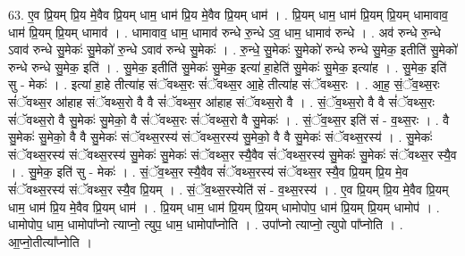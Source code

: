 \documentclass[17pt]{extarticle}
\begin{document}
63. ए॒व प्रि॒यम् प्रि॒य मे॒वैव प्रि॒यम् धाम॒ धाम॑ प्रि॒य मे॒वैव प्रि॒यम् धाम॑ । . प्रि॒यम् धाम॒ धाम॑ प्रि॒यम् प्रि॒यम् धामावाव॒ धाम॑ प्रि॒यम् प्रि॒यम् धामाव॑ । . धामावाव॒ धाम॒ धामाव॑ रुन्धे रु॒न्धे ऽव॒ धाम॒ धामाव॑ रुन्धे । . अव॑ रुन्धे रु॒न्धे ऽवाव॑ रुन्धे सु॒मेकः॑ सु॒मेको॑ रु॒न्धे ऽवाव॑ रुन्धे सु॒मेकः॑ । . रु॒न्धे॒ सु॒मेकः॑ सु॒मेको॑ रुन्धे रुन्धे सु॒मेक॒ इतीति॑ सु॒मेको॑ रुन्धे रुन्धे सु॒मेक॒ इति॑ । . सु॒मेक॒ इतीति॑ सु॒मेकः॑ सु॒मेक॒ इत्या॑ हा॒हेति॑ सु॒मेकः॑ सु॒मेक॒ इत्या॑ह । . सु॒मेक॒ इति॑ सु - मेकः॑ । . इत्या॑ हा॒हे तीत्या॑ह संॅवथ्स॒रः सं॑ॅवथ्स॒र आ॒हे तीत्या॑ह संॅवथ्स॒रः । . आ॒ह॒ सं॒ॅव॒थ्स॒रः सं॑ॅवथ्स॒र आ॑हाह संॅवथ्स॒रो वै वै सं॑ॅवथ्स॒र आ॑हाह संॅवथ्स॒रो वै । . सं॒ॅव॒थ्स॒रो वै वै सं॑ॅवथ्स॒रः सं॑ॅवथ्स॒रो वै सु॒मेकः॑ सु॒मेको॒ वै सं॑ॅवथ्स॒रः सं॑ॅवथ्स॒रो वै सु॒मेकः॑ । . सं॒ॅव॒थ्स॒र इति॑ सं - व॒थ्स॒रः । . वै सु॒मेकः॑ सु॒मेको॒ वै वै सु॒मेकः॑ संॅवथ्स॒रस्य॑ संॅवथ्स॒रस्य॑ सु॒मेको॒ वै वै सु॒मेकः॑ संॅवथ्स॒रस्य॑ । . सु॒मेकः॑ संॅवथ्स॒रस्य॑ संॅवथ्स॒रस्य॑ सु॒मेकः॑ सु॒मेकः॑ संॅवथ्स॒र स्यै॒वैव सं॑ॅवथ्स॒रस्य॑ सु॒मेकः॑ सु॒मेकः॑ संॅवथ्स॒र स्यै॒व । . सु॒मेक॒ इति॑ सु - मेकः॑ । . सं॒ॅव॒थ्स॒र स्यै॒वैव सं॑ॅवथ्स॒रस्य॑ संॅवथ्स॒र स्यै॒व प्रि॒यम् प्रि॒य मे॒व सं॑ॅवथ्स॒रस्य॑ संॅवथ्स॒र स्यै॒व प्रि॒यम् । . सं॒ॅव॒थ्स॒रस्येति॑ सं - व॒थ्स॒रस्य॑ । . ए॒व प्रि॒यम् प्रि॒य मे॒वैव प्रि॒यम् धाम॒ धाम॑ प्रि॒य मे॒वैव प्रि॒यम् धाम॑ । . प्रि॒यम् धाम॒ धाम॑ प्रि॒यम् प्रि॒यम् धामोपोप॒ धाम॑ प्रि॒यम् प्रि॒यम् धामोप॑ । . धामोपोप॒ धाम॒ धामोपा᳚प्नो त्याप्नो॒ त्युप॒ धाम॒ धामोपा᳚प्नोति । . उपा᳚प्नो त्याप्नो॒ त्युपो पा᳚प्नोति । . आ॒प्नो॒तीत्या᳚प्नोति । \newline
\pagebreak
{}
\end{document}
